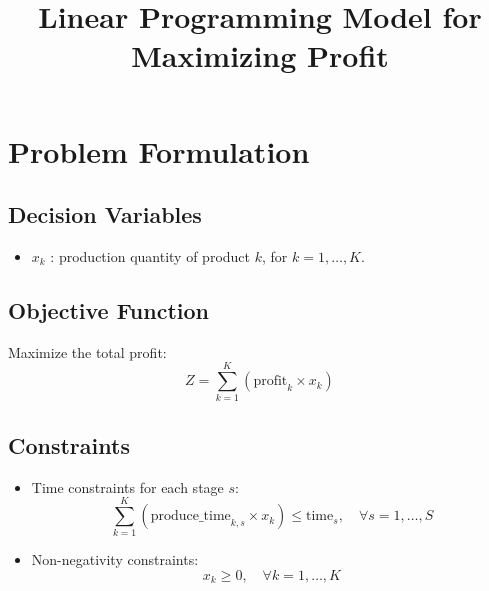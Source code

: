 \documentclass{article}
\begin{document}
\title{Linear Programming Model for Maximizing Profit}
\author{}
\date{}
\maketitle

\section*{Problem Formulation}

\subsection*{Decision Variables}
\begin{itemize}
    \item \( x_k \) : production quantity of product \( k \), for \( k = 1, \ldots, K \).
\end{itemize}

\subsection*{Objective Function}
Maximize the total profit:
\[
Z = \sum_{k=1}^{K} \left( \text{profit}_{k} \times x_k \right)
\]

\subsection*{Constraints}
\begin{itemize}
    \item Time constraints for each stage \( s \):
    \[
    \sum_{k=1}^{K} \left( \text{produce\_time}_{k,s} \times x_k \right) \leq \text{time}_{s}, \quad \forall s = 1, \ldots, S
    \]
    \item Non-negativity constraints:
    \[
    x_k \geq 0, \quad \forall k = 1, \ldots, K
    \]
\end{itemize}
\end{document}
